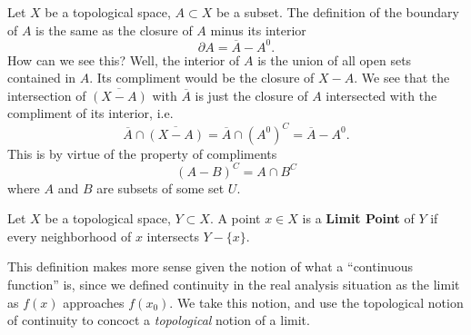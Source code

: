 \begin{rmk}
Let $X$ be a topological space, $A\subset X$ be a subset. The definition
of the boundary of $A$ is the same as the closure of $A$ minus its
interior
\begin{equation}
\partial A = \overline{A}-A^0.
\end{equation}
How can we see this? Well, the interior of $A$ is the union of all
open sets contained in $A$. Its compliment would be the closure of
$X-A$. We see that the intersection of $\overline{(X-A)}$ with
$\overline{A}$ is just the closure of $A$ intersected with the
compliment of its interior, i.e.
\begin{equation}
\overline{A}\cap\overline{(X-A)}=\overline{A}\cap\left(A^0\right)^C =
\overline{A}-A^0.
\end{equation}
This is by virtue of the property of compliments
\begin{equation}
(A-B)^C = A\cap B^C
\end{equation}
where $A$ and $B$ are subsets of some set $U$.
\end{rmk}

\begin{defn}
Let $X$ be a topological space, $Y\subset X$. A point $x\in X$ is 
a \textbf{Limit Point} of $Y$ if every neighborhood of $x$ intersects
$Y-\{x\}$.
\end{defn}
\begin{rmk}
This definition makes more sense given the notion of what a
``continuous function'' is, since we defined continuity in the
real analysis situation as the limit as $f(x)$ approaches
$f(x_0)$. We take this notion, and use the topological notion of
continuity to concoct a \emph{topological} notion of a limit.
\end{rmk}
